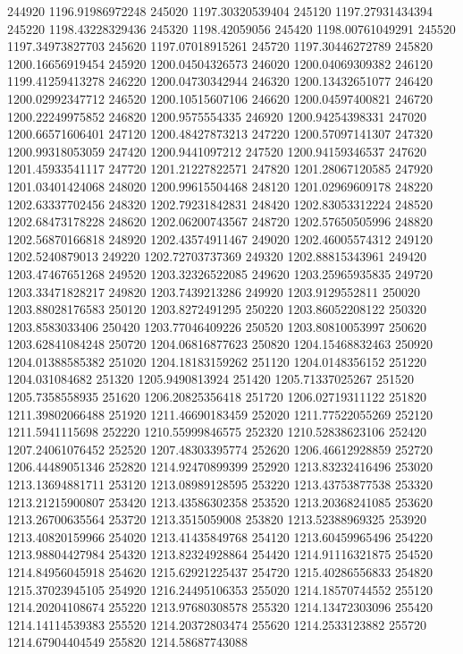 {244920 1196.91986972248
245020 1197.30320539404
245120 1197.27931434394
245220 1198.43228329436
245320 1198.42059056
245420 1198.00761049291
245520 1197.34973827703
245620 1197.07018915261
245720 1197.30446272789
245820 1200.16656919454
245920 1200.04504326573
246020 1200.04069309382
246120 1199.41259413278
246220 1200.04730342944
246320 1200.13432651077
246420 1200.02992347712
246520 1200.10515607106
246620 1200.04597400821
246720 1200.22249975852
246820 1200.9575554335
246920 1200.94254398331
247020 1200.66571606401
247120 1200.48427873213
247220 1200.57097141307
247320 1200.99318053059
247420 1200.9441097212
247520 1200.94159346537
247620 1201.45933541117
247720 1201.21227822571
247820 1201.28067120585
247920 1201.03401424068
248020 1200.99615504468
248120 1201.02969609178
248220 1202.63337702456
248320 1202.79231842831
248420 1202.83053312224
248520 1202.68473178228
248620 1202.06200743567
248720 1202.57650505996
248820 1202.56870166818
248920 1202.43574911467
249020 1202.46005574312
249120 1202.5240879013
249220 1202.72703737369
249320 1202.88815343961
249420 1203.47467651268
249520 1203.32326522085
249620 1203.25965935835
249720 1203.33471828217
249820 1203.7439213286
249920 1203.9129552811
250020 1203.88028176583
250120 1203.8272491295
250220 1203.86052208122
250320 1203.8583033406
250420 1203.77046409226
250520 1203.80810053997
250620 1203.62841084248
250720 1204.06816877623
250820 1204.15468832463
250920 1204.01388585382
251020 1204.18183159262
251120 1204.0148356152
251220 1204.031084682
251320 1205.9490813924
251420 1205.71337025267
251520 1205.7358558935
251620 1206.20825356418
251720 1206.02719311122
251820 1211.39802066488
251920 1211.46690183459
252020 1211.77522055269
252120 1211.5941115698
252220 1210.55999846575
252320 1210.52838623106
252420 1207.24061076452
252520 1207.48303395774
252620 1206.46612928859
252720 1206.44489051346
252820 1214.92470899399
252920 1213.83232416496
253020 1213.13694881711
253120 1213.08989128595
253220 1213.43753877538
253320 1213.21215900807
253420 1213.43586302358
253520 1213.20368241085
253620 1213.26700635564
253720 1213.3515059008
253820 1213.52388969325
253920 1213.40820159966
254020 1213.41435849768
254120 1213.60459965496
254220 1213.98804427984
254320 1213.82324928864
254420 1214.91116321875
254520 1214.84956045918
254620 1215.62921225437
254720 1215.40286556833
254820 1215.37023945105
254920 1216.24495106353
255020 1214.18570744552
255120 1214.20204108674
255220 1213.97680308578
255320 1214.13472303096
255420 1214.14114539383
255520 1214.20372803474
255620 1214.2533123882
255720 1214.67904404549
255820 1214.58687743088
}
